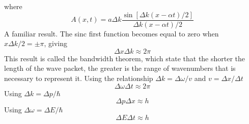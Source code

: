 \documentclass[../../../main.tex]{subfiles}
\begin{document}
where
\begin{equation*}
    A(x, t) = a\Delta k\frac{\sin[\Delta k(x-\alpha t)/2]}{\Delta k(x-\alpha t)/2}
\end{equation*}
A familiar result. The sinc ﬁrst function becomes equal to zero when $x \Delta k/2 =\pm \pi$, giving
\begin{equation*}
    \Delta x\Delta k \approx 2\pi
\end{equation*}
This result is called the bandwidth theorem, which state that the shorter the length of the wave packet, the greater is the range of wavenumbers that is necessary to represent it. Using the relationship $\Delta k=\Delta\omega/v$ and $v=\Delta x/\Delta t$
\begin{equation*}
    \Delta \omega\Delta t\approx2\pi
\end{equation*}
Using $\Delta k=\Delta p/\hbar$
\begin{equation*}
    \Delta p\Delta x\approx h
\end{equation*}
Using $\Delta \omega=\Delta E/\hbar$
\begin{equation*}
    \Delta E\Delta t\approx h
\end{equation*}
\end{document}
